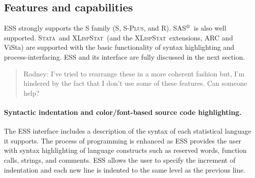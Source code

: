 \documentclass{article}
\newcommand*{\SAS}{\textsc{SAS}$^{\mbox{\scriptsize\textregistered}}$}
\newcommand*{\Splus}{\textsc{S-Plus}}
\newcommand*{\XLispStat}{\textsc{XLispStat}}
\newcommand*{\Stata}{\textsc{Stata}}
\newcommand{\stexttt}[1]{{\small\texttt{#1}}}
\begin{document}



\subsection{Features and capabilities}
\label{sec:ESS:features}


ESS strongly supports the S family (S, \Splus, and R).
\SAS\ is also well supported.  \Stata\
and \XLispStat\ (and the \XLispStat\ extensions, ARC and ViSta) are
supported with the basic functionality of syntax highlighting and
process-interfacing.  ESS and its interface are fully discussed in the
next section.

\begin{quote}
 Rodney:  I've tried to rearrange these in a more coherent fashion
but, I'm hindered by the fact that I don't use some of these
features.  Can someone help?
\end{quote}

\paragraph{Syntactic indentation and color/font-based source code
  highlighting.}  The ESS interface includes a description of the
syntax of each statistical language it supports.
The process of programming is enhanced as ESS provides the user with
syntax highlighting of language constructs such as reserved words,
function calls, strings, and comments.  ESS allows the user to specify
the increment of indentation and each new line is indented
to the same level as the previous line.
\end{document}
